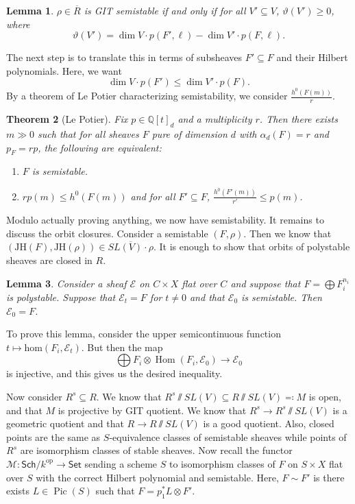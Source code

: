\documentclass[leqno, openany]{memoir}
\newtheorem{thm}{Theorem}[section]
\newtheorem{lem}[thm]{Lemma}
\theoremstyle{definition}
\theoremstyle{remark}
\theoremstyle{plain}
\theoremstyle{definition}
\theoremstyle{remark}
\newcommand{\Q}{\mathbb{Q}}
\newcommand{\mc}[1]{\mathcal{#1}}
\newcommand{\mr}[1]{\mathrm{#1}}
\newcommand{\ms}[1]{\mathsf{#1}}
\newcommand{\ol}[1]{\overline{#1}}
\DeclareMathOperator{\Hom}{Hom}
\DeclareMathOperator{\Pic}{Pic}
\begin{document}
\begin{lem}
    $\rho \in \ol{R}$ is GIT semistable if and only if for all $V' \subseteq V$, $\vartheta(V') \geq 0$, where
    \[ \vartheta(V') = \dim V \cdot p(F', \ell) - \dim V' \cdot p(F, \ell). \]
\end{lem}

The next step is to translate this in terms of subsheaves $F' \subseteq F$ and their Hilbert polynomials. Here, we want 
\[ \dim V \cdot p(F') \leq \dim V' \cdot p(F). \]
By a theorem of Le Potier characterizing semistability, we consider $\frac{h^0(F(m))}{r}$.

\begin{thm}[Le Potier]
    Fix $p \in \Q[t]_d$ and a multiplicity $r$. Then there exists $m \gg 0$ such that for all sheaves $F$ pure of dimension $d$ with $\alpha_d(F) = r$ and $p_F = rp$, the following are equivalent:
    \begin{enumerate}
        \item $F$ is semistable.
        \item $rp(m) \leq h^0(F(m))$ and for all $F' \subseteq F$, $\frac{h^0(F'(m))}{r'} \leq p(m)$.
    \end{enumerate}
\end{thm}

Modulo actually proving anything, we now have semistability. It remains to discuss the orbit closures. Consider a semistable $(F, \rho)$. Then we know that $(\mr{JH}(F), \mr{JH}(\rho)) \in \ol{SL(V) \cdot \rho}$. It is enough to show that orbits of polystable sheaves are closed in $R$.

\begin{lem}
    Consider a sheaf $\mc{E}$ on $C \times X$ flat over $C$ and suppose that $F = \bigoplus F_i^{n_i}$ is polystable. Suppose that $\mc{E}_t = F$ for $t \neq 0$ and that $\mc{E}_0$ is semistable. Then $\mc{E}_0 = F$.
\end{lem}

To prove this lemma, consider the upper semicontinuous function $t \mapsto \mr{hom}(F_i, \mc{E}_t)$. But then the map
\[ \bigoplus F_i \otimes \Hom(F_i, \mc{E}_0) \to \mc{E}_0 \]
is injective, and this gives us the desired inequality.

Now consider $R^s \subseteq R$. We know that $R^s \sslash SL(V) \subseteq R \sslash SL(V) \eqqcolon M$ is open, and that $M$ is projective by GIT quotient. We know that $R^s \to R^s \sslash SL(V)$ is a geometric quotient and that $R \to R \sslash SL(V)$ is a good quotient. Also, closed points are the same as $S$-equivalence classes of semistable sheaves while points of $R^s$ are isomorphism classes of stable sheaves. Now recall the functor $\mc{M} \colon \ms{Sch}/k^{\mr{op}} \to \ms{Set}$ sending a scheme $S$ to isomorphism classes of $F$ on $S \times X$ flat over $S$ with the correct Hilbert polynomial and semistable. Here, $F \sim F'$ is there exists $L \in \Pic(S)$ such that $F = p_1^* L \otimes F'$.
\end{document}
